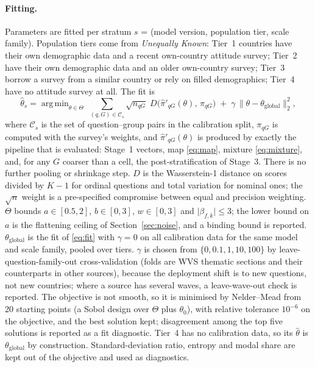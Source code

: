 \documentclass[11pt]{article}
\DeclareMathOperator*{\argmin}{arg\,min}
\begin{document}
\paragraph{Fitting.} Parameters are fitted per stratum $s$ = (model version, population tier, scale family). Population tiers come from \emph{Unequally Known}: Tier~1 countries have their own demographic data and a recent own-country attitude survey; Tier~2 have their own demographic data and an older own-country survey; Tier~3 borrow a survey from a similar country or rely on filled demographics; Tier~4 have no attitude survey at all. The fit is
\begin{equation}
\hat\theta_s = \argmin_{\theta\in\Theta}\; \sum_{(q,G)\in\mathcal{C}_s} \sqrt{n_{qG}}\; D\big(\hat\pi'_{qG}(\theta),\,\pi_{qG}\big) \;+\; \gamma\,\lVert \theta-\theta_{\text{global}}\rVert_2^2 ,
\label{eq:fit}
\end{equation}
where $\mathcal{C}_s$ is the set of question--group pairs in the calibration split, $\pi_{qG}$ is computed with the survey's weights, and $\hat\pi'_{qG}(\theta)$ is produced by exactly the pipeline that is evaluated: Stage~1 vectors, map \eqref{eq:map}, mixture \eqref{eq:mixture}, and, for any $G$ coarser than a cell, the post-stratification of Stage~3. There is no further pooling or shrinkage step. $D$ is the Wasserstein-1 distance on scores divided by $K-1$ for ordinal questions and total variation for nominal ones; the $\sqrt{n}$ weight is a pre-specified compromise between equal and precision weighting. $\Theta$ bounds $a\in[0.5,2]$, $b\in[0,3]$, $w\in[0,3]$ and $\lvert\beta_{f,k}\rvert\le 3$; the lower bound on $a$ is the flattening ceiling of Section~\ref{sec:noise}, and a binding bound is reported. $\theta_{\text{global}}$ is the fit of \eqref{eq:fit} with $\gamma=0$ on all calibration data for the same model and scale family, pooled over tiers. $\gamma$ is chosen from $\{0, 0.1, 1, 10, 100\}$ by leave-question-family-out cross-validation (folds are WVS thematic sections and their counterparts in other sources), because the deployment shift is to new questions, not new countries; where a source has several waves, a leave-wave-out check is reported. The objective is not smooth, so it is minimised by Nelder--Mead from 20 starting points (a Sobol design over $\Theta$ plus $\theta_0$), with relative tolerance $10^{-6}$ on the objective, and the best solution kept; disagreement among the top five solutions is reported as a fit diagnostic. Tier~4 has no calibration data, so its $\hat\theta$ is $\theta_{\text{global}}$ by construction. Standard-deviation ratio, entropy and modal share are kept out of the objective and used as diagnostics.
\end{document}
